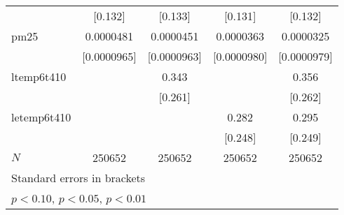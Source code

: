 \documentclass[11pt]{article}
\begin{document}
\begin{subappendices}
\begin{center}
{{\begin{tabular}{l*{4}{c}}
						&     [0.132]         &     [0.133]         &     [0.131]         &     [0.132]         \\
						[1em]
						pm25        &   0.0000481         &   0.0000451         &   0.0000363         &   0.0000325         \\
						& [0.0000965]         & [0.0000963]         & [0.0000980]         & [0.0000979]         \\
						[1em]
						ltemp6t410  &                     &       0.343         &                     &       0.356         \\
						&                     &     [0.261]         &                     &     [0.262]         \\
						[1em]
						letemp6t410 &                     &                     &       0.282         &       0.295         \\
						&                     &                     &     [0.248]         &     [0.249]         \\
						\hline
						\(N\)       &      250652         &      250652         &      250652         &      250652         \\
						\hline\hline
						\multicolumn{5}{l}{\footnotesize Standard errors in brackets}\\
						\multicolumn{5}{l}{\footnotesize \sym{*} \(p<0.10\), \sym{**} \(p<0.05\), \sym{***} \(p<0.01\)}\\
					\end{tabular}
				}
				
			}
		\end{center}
		

\end{subappendices}
\end{document}
